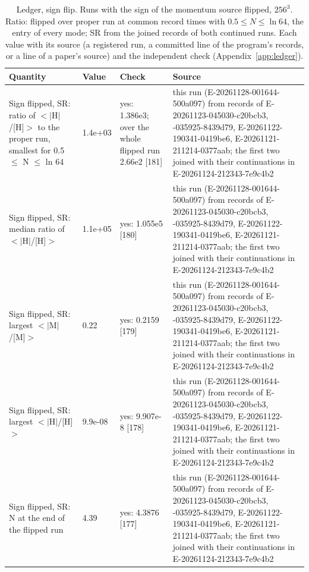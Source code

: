 \begin{table}
\caption{Ledger, sign flip. Runs with the sign of the momentum source flipped, $256^3$. Ratio: flipped over proper run at common record times with $0.5 \le N \le \ln 64$, the entry of every mode; SR from the joined records of both continued runs. Each value with its source (a registered run, a committed line of the program's records, or a line of a paper's source) and the independent check (Appendix~\ref{app:ledger}).}
\label{tab:ledgersignflip}
\footnotesize
\begin{tabular}{p{}p{}p{}p{}}
\toprule
Quantity & Value & Check & Source \\
\midrule
Sign flipped, SR: ratio of $<$$|$H$|$/\allowbreak{}[H]$>$ to the proper run, smallest for 0.5 $\le$ N $\le$ ln 64 & 1.4e+03 & yes: 1.386e3; over the whole flipped run 2.66e2 [181] & this run (E-20261128-001644-500a097) from records of E-20261123-045030-c20bcb3, -035925-8439d79, E-20261122-190341-0419be6, E-20261121-211214-0377aab; the first two joined with their continuations in E-20261124-212343-7e9c4b2 \\
Sign flipped, SR: median ratio of $<$$|$H$|$/\allowbreak{}[H]$>$ & 1.1e+05 & yes: 1.055e5 [180] & this run (E-20261128-001644-500a097) from records of E-20261123-045030-c20bcb3, -035925-8439d79, E-20261122-190341-0419be6, E-20261121-211214-0377aab; the first two joined with their continuations in E-20261124-212343-7e9c4b2 \\
Sign flipped, SR: largest $<$$|$M$|$/\allowbreak{}[M]$>$ & 0.22 & yes: 0.2159 [179] & this run (E-20261128-001644-500a097) from records of E-20261123-045030-c20bcb3, -035925-8439d79, E-20261122-190341-0419be6, E-20261121-211214-0377aab; the first two joined with their continuations in E-20261124-212343-7e9c4b2 \\
Sign flipped, SR: largest $<$$|$H$|$/\allowbreak{}[H]$>$ & 9.9e-08 & yes: 9.907e-8 [178] & this run (E-20261128-001644-500a097) from records of E-20261123-045030-c20bcb3, -035925-8439d79, E-20261122-190341-0419be6, E-20261121-211214-0377aab; the first two joined with their continuations in E-20261124-212343-7e9c4b2 \\
Sign flipped, SR: N at the end of the flipped run & 4.39 & yes: 4.3876 [177] & this run (E-20261128-001644-500a097) from records of E-20261123-045030-c20bcb3, -035925-8439d79, E-20261122-190341-0419be6, E-20261121-211214-0377aab; the first two joined with their continuations in E-20261124-212343-7e9c4b2 \\

\end{tabular}
\end{table}
